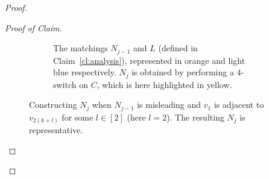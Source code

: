 \documentclass[11pt,a4paper]{article}
\theoremstyle{definition}
\newenvironment{poc}{\begin{proof}[Proof of
    Claim]\renewcommand*{\qedsymbol}{$\blacksquare$}}{\end{proof}}
\begin{document}
\begin{proof}
\begin{poc}
\begin{figure}[ht!]
\begin{subfigure}[t]{.5\linewidth}
        \caption{The matchings $N_{j-1}$ and $L$ (defined in Claim~\ref{cl:analysis}), represented in orange and
          light blue respectively. $N_j$ is obtained by performing a $4$-switch on
          $C$, which is here highlighted in yellow.}  
      \end{subfigure}
      \caption{Constructing $N_{j}$ when $N_{j-1}$ is misleading and $v_1$ is
        adjacent to $v_{2(k+l)}$ for some $l \in [2]$ (here $l=2$). The resulting $N_{j}$ is representative.}\label{fig:UF}
    \end{figure}


\end{poc}
\end{proof}
\end{document}
